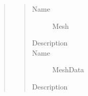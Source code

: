 \documentclass[letterpaper,10pt,english]{sphinxmanual}
\begin{document}
\begin{quote}
\begin{description}
\begin{quote}
\begin{description}
\item[{Name}] \leavevmode
Mesh

\item[{Description}] \leavevmode
{}

\item[{Name}] \leavevmode
MeshData

\item[{Description}] \leavevmode
{}

\end{description}\end{quote}

\end{description}\end{quote}
\end{document}

